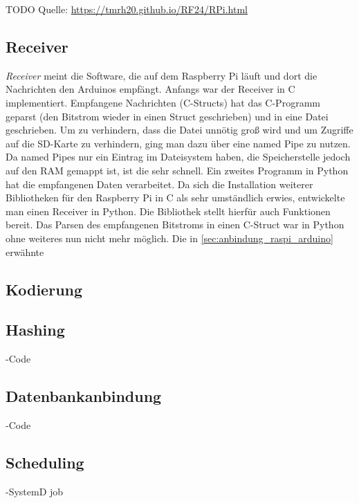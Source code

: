 TODO Quelle: \url{https://tmrh20.github.io/RF24/RPi.html}

\subsection{Receiver}
\textit{Receiver} meint die Software, die auf dem Raspberry Pi läuft und dort die Nachrichten den Arduinos empfängt. Anfangs war der Receiver in C implementiert. Empfangene Nachrichten (C-Structs) hat das C-Programm geparst (den Bitstrom wieder in einen Struct geschrieben) und in eine Datei geschrieben. Um zu verhindern, dass die Datei unnötig groß wird und um Zugriffe auf die SD-Karte zu verhindern, ging man dazu über eine named Pipe zu nutzen. Da named Pipes nur ein Eintrag im Dateisystem haben, die Speicherstelle jedoch auf den RAM gemappt ist, ist die sehr schnell. Ein zweites Programm in Python hat die empfangenen Daten verarbeitet. 
Da sich die Installation weiterer Bibliotheken für den Raspberry Pi in C als sehr umständlich erwies, entwickelte man einen Receiver in Python. Die Bibliothek stellt hierfür auch Funktionen bereit.  
Das Parsen des empfangenen Bitstroms in einen C-Struct war in Python ohne weiteres nun nicht mehr möglich. 
Die in \ref{sec:anbindung_raspi_arduino} erwähnte 


\subsection{Kodierung}
\subsection{Hashing}
-Code
\subsection{Datenbankanbindung}
-Code
\subsection{Scheduling}
-SystemD job